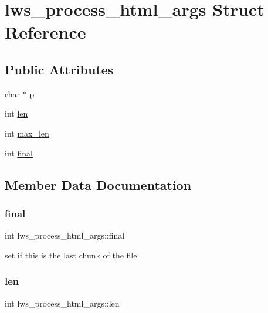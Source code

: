 \hypertarget{structlws__process__html__args}{}\section{lws\+\_\+process\+\_\+html\+\_\+args Struct Reference}
\label{structlws__process__html__args}
\subsection*{Public Attributes}
\begin{DoxyCompactItemize}
\item 
char $\ast$ \hyperlink{structlws__process__html__args_a7102ccce4bdc5abda196b5876589fa6c}{p}
\item 
int \hyperlink{structlws__process__html__args_a754513f2311241cabb0cd1c90d7307ef}{len}
\item 
int \hyperlink{structlws__process__html__args_a8be7fd396a1942ea2449a2fda990ff99}{max\+\_\+len}
\item 
int \hyperlink{structlws__process__html__args_a362547891ee0d693f3900a1f807ea475}{final}
\end{DoxyCompactItemize}


\subsection{Member Data Documentation}
\mbox{\label{structlws__process__html__args_a362547891ee0d693f3900a1f807ea475}} 
\subsubsection{\texorpdfstring{final}{final}}
{\footnotesize\ttfamily int lws\+\_\+process\+\_\+html\+\_\+args\+::final}

set if this is the last chunk of the file \mbox{\label{structlws__process__html__args_a754513f2311241cabb0cd1c90d7307ef}} 
\subsubsection{\texorpdfstring{len}{len}}
{\footnotesize\ttfamily int lws\+\_\+process\+\_\+html\+\_\+args\+::len}

